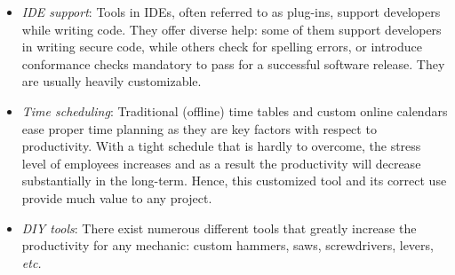 \documentclass [11pt, a4wide, twoside]{article}
\begin{document}
\begin{enumerate}[i)]
{\begin{itemize}
\item \textit{IDE support}: Tools in IDEs, often referred to as plug-ins, support developers while writing code. They offer diverse help: some of them support developers in writing secure code, while others check for spelling errors, or introduce conformance checks mandatory to pass for a successful software release. They are usually heavily customizable.
\item \textit{Time scheduling}: Traditional (offline) time tables and custom online calendars ease proper time planning as they are key factors with respect to productivity. With a tight schedule that is hardly to overcome, the stress level of employees increases and as a result the productivity will decrease substantially in the long-term. Hence, this customized tool and its correct use provide much value to any project.
\item \textit{DIY tools}: There exist numerous different tools that greatly increase the productivity for any mechanic: custom hammers, saws, screwdrivers, levers, \textit{etc.}
\end{itemize}}
\end{enumerate}
\end{document}
